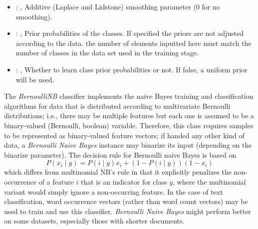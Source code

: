 \begin{itemize}
    \item {}: , 
      Additive (Laplace and Lidstone) smoothing parameter (0 for no smoothing).

    \item {}: , 
      Prior probabilities of the classes. If specified the priors are
      not adjusted according to the data. \nb the number of elements inputted here must
      match the number of classes in the data set used in the training stage.

    \item {}: , 
      Whether to learn class prior probabilities or not. If false, a uniform
      prior will be used.
  \end{itemize}
 The \textit{BernoulliNB} classifier implements the naive Bayes training and
 classification algorithms for data that is distributed according to multivariate
 Bernoulli distributions; i.e., there may be multiple features but each one is
 assumed to be a binary-valued (Bernoulli, boolean) variable.                          Therefore,
 this class requires samples to be represented as binary-valued                          feature
 vectors; if handed any other kind of data, a \textit{Bernoulli Naive
 Bayes} instance may binarize its input (depending on the binarize parameter).
 The decision rule for Bernoulli naive Bayes is based on                          \begin{equation}
 P(x_i \mid y) = P(i \mid y) x_i + (1 - P(i \mid y)) (1 - x_i)
 \end{equation}                          which differs from multinomial NB's rule in that it
 explicitly penalizes the                          non-occurrence of a feature $i$ that is an
 indicator for class $y$, where the                          multinomial variant would simply ignore
 a non-occurring feature.                          In the case of text classification, word
 occurrence vectors (rather than word                          count vectors) may be used to train
 and use this classifier.                          \textit{Bernoulli Naive Bayes} might perform
 better on some datasets, especially                          those with shorter documents.


